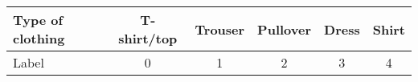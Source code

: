 \begin{tabular}{lccccc}
\hline Type of clothing & T-shirt/top & Trouser & Pullover & Dress & Shirt \\
\hline Label & 0 & 1 & 2 & 3 & 4 \\
\hline
\end{tabular}
